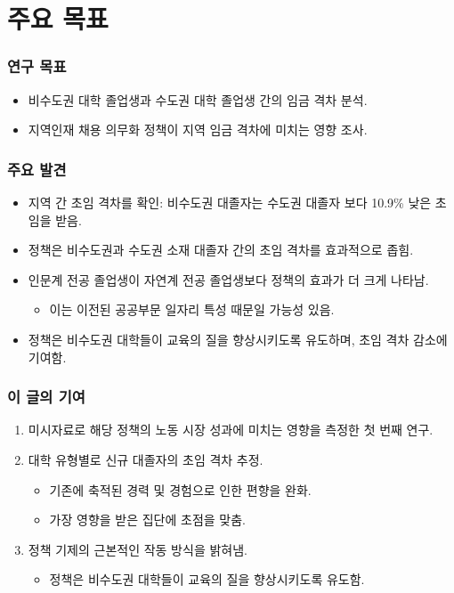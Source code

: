 \documentclass[aspectratio=169,xcolor=dvipsnames,handout]{beamer}
\begin{document}
\section{주요 목표}
\begin{frame}
    \frametitle{연구 목표}
    \begin{itemize}[<+->]
        \item 비수도권 대학 졸업생과 수도권 대학 졸업생 간의 임금 격차 분석.
        \item 지역인재 채용 의무화 정책이 지역 임금 격차에 미치는 영향 조사.
    \end{itemize}
\end{frame}

\begin{frame}
    \frametitle{주요 발견}
    \begin{itemize}[<+->]
        \item 지역 간 초임 격차를 확인: 비수도권 대졸자는 수도권 대졸자 보다 10.9\% 낮은 초임을 받음.
        \item 정책은 비수도권과 수도권 소재 대졸자 간의 초임 격차를 효과적으로 좁힘.
        \item 인문계 전공 졸업생이 자연계 전공 졸업생보다 정책의 효과가 더 크게 나타남.
        \begin{itemize}[<+->]
            \item 이는 이전된 공공부문 일자리 특성 때문일 가능성 있음.
        \end{itemize}
        \item 정책은 비수도권 대학들이 교육의 질을 향상시키도록 유도하며, 초임 격차 감소에 기여함.
    \end{itemize}
\end{frame}

\begin{frame}
    \frametitle{이 글의 기여}
    \begin{enumerate}[<+->]
        \item 미시자료로 해당 정책의 노동 시장 성과에 미치는 영향을 측정한 첫 번째 연구.
        \item 대학 유형별로 신규 대졸자의 초임 격차 추정.
        \begin{itemize}[<+->]
            \item 기존에 축적된 경력 및 경험으로 인한 편향을 완화.
            \item 가장 영향을 받은 집단에 초점을 맞춤.
        \end{itemize}
        \item 정책 기제의 근본적인 작동 방식을 밝혀냄.
        \begin{itemize}[<+->]
            \item 정책은 비수도권 대학들이 교육의 질을 향상시키도록 유도함.
        \end{itemize}
    \end{enumerate}
\end{frame}
\end{document}
